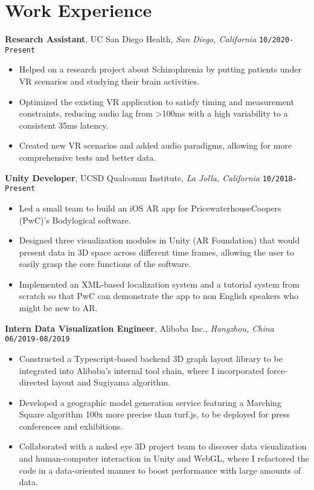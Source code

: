 \documentclass[10pt, letterpaper]{article}
\begin{document}
	\section{Work Experience}
	\smallskip
	\textbf{\large Research Assistant}, UC San Diego Health, \textit{San Diego, California} \hfill \texttt{10/2020-Present}
	\begin{itemize}
		\item Helped on a research project about Schizophrenia by putting patients under VR scenarios and studying their brain activities.

		\item Optimized the existing VR application to satisfy timing and measurement constraints, reducing audio lag from >100ms with a high variability to a consistent 35ms latency.

		\item Created new VR scenarios and added audio paradigms, allowing for more comprehensive tests and better data.

	\end{itemize}
	\textbf{\large Unity Developer}, UCSD Qualcomm Institute, \textit{La Jolla, California} \hfill \texttt{10/2018-Present}
	\begin{itemize}
		\item Led a small team to build an iOS AR app for PricewaterhouseCoopers (PwC)'s Bodylogical software.

		\item Designed three visualization modules in Unity (AR Foundation) that would present data in 3D space across different time frames, allowing the user to easily grasp the core functions of the software.

		\item Implemented an XML-based localization system and a tutorial system from scratch so that PwC can demonstrate the app to non English speakers who might be new to AR.

	\end{itemize}
	\textbf{\large Intern Data Visualization Engineer}, Alibaba Inc., \textit{Hangzhou, China} \hfill \texttt{06/2019-08/2019}
	\begin{itemize}
		\item Constructed a Typescript-based backend 3D graph layout library to be integrated into Alibaba's internal tool chain, where I incorporated force-directed layout and Sugiyama algorithm.

		\item Developed a geographic model generation service featuring a Marching Square algorithm 100x more precise than turf.js, to be deployed for press conferences and exhibitions.

		\item Collaborated with a naked eye 3D project team to discover data visualization and human-computer interaction in Unity and WebGL, where I refactored the code in a data-oriented manner to boost performance with large amounts of data.

	\end{itemize}
\end{document}
